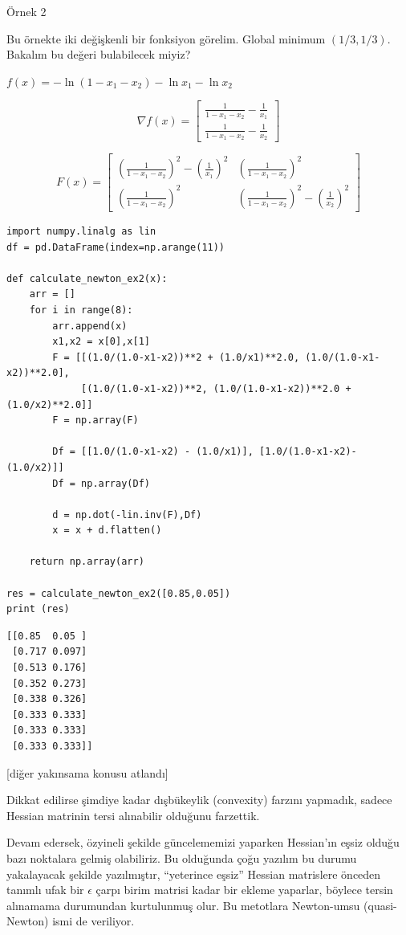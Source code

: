 \documentclass[12pt,fleqn]{article}\usepackage{../../common}
\begin{document}
Örnek 2

Bu örnekte iki değişkenli bir fonksiyon görelim. Global minimum
$(1/3,1/3)$. Bakalım bu değeri bulabilecek miyiz?

$f(x) = -\ln( 1 - x_1 - x_2) - \ln x_1 - \ln x_2$

$$
\nabla f(x) = 
\left[\begin{array}{r}
\frac{1}{1-x_1-x_2} - \frac{1}{x_1} \\
\frac{1}{1-x_1-x_2} - \frac{1}{x_2} 
\end{array}\right]
$$

$$
F(x) = 
\left[\begin{array}{rr}
(\frac{1}{1-x_1-x_2})^2 - (\frac{1}{x_1})^2 & (\frac{1}{1-x_1-x_2} )^2 \\
(\frac{1}{1-x_1-x_2} )^2 & (\frac{1}{1-x_1-x_2})^2 - (\frac{1}{x_2})^2
\end{array}\right]
$$

\begin{verbatim}
import numpy.linalg as lin
df = pd.DataFrame(index=np.arange(11))

def calculate_newton_ex2(x):    
    arr = []
    for i in range(8):
        arr.append(x)
        x1,x2 = x[0],x[1]    
        F = [[(1.0/(1.0-x1-x2))**2 + (1.0/x1)**2.0, (1.0/(1.0-x1-x2))**2.0],
             [(1.0/(1.0-x1-x2))**2, (1.0/(1.0-x1-x2))**2.0 + (1.0/x2)**2.0]]
        F = np.array(F)

        Df = [[1.0/(1.0-x1-x2) - (1.0/x1)], [1.0/(1.0-x1-x2)-(1.0/x2)]]
        Df = np.array(Df)

        d = np.dot(-lin.inv(F),Df)
        x = x + d.flatten()

    return np.array(arr)

res = calculate_newton_ex2([0.85,0.05])
print (res)
\end{verbatim}

\begin{verbatim}
[[0.85  0.05 ]
 [0.717 0.097]
 [0.513 0.176]
 [0.352 0.273]
 [0.338 0.326]
 [0.333 0.333]
 [0.333 0.333]
 [0.333 0.333]]
\end{verbatim}

[diğer yakınsama konusu atlandı]

Dikkat edilirse şimdiye kadar dışbükeylik (convexity) farzını yapmadık,
sadece Hessian matrinin tersi alınabilir olduğunu farzettik. 

Devam edersek, özyineli şekilde güncelememizi yaparken Hessian'ın eşsiz
olduğu bazı noktalara gelmiş olabiliriz. Bu olduğunda çoğu yazılım bu
durumu yakalayacak şekilde yazılmıştır, ``yeterince eşsiz'' Hessian
matrislere önceden tanımlı ufak bir $\epsilon$ çarpı birim matrisi kadar
bir ekleme yaparlar, böylece tersin alınamama durumundan kurtulunmuş olur. 
Bu metotlara Newton-umsu (quasi-Newton) ismi de veriliyor. 
\end{document}
